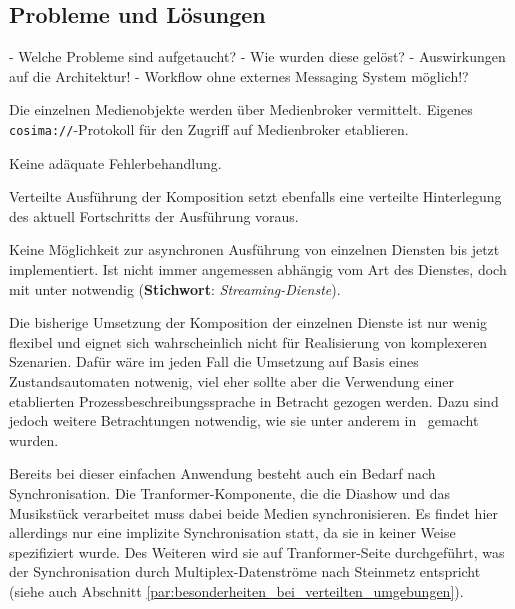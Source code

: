   
\subsection{Probleme und Lösungen} %
\label{sub:probleme_und_loesungen_architektur}

  - Welche Probleme sind aufgetaucht?
  - Wie wurden diese gelöst?
  - Auswirkungen auf die Architektur!
  - Workflow ohne externes Messaging System möglich!?
  
  Die einzelnen Medienobjekte werden über Medienbroker vermittelt. Eigenes \verb!cosima://!-Protokoll für den Zugriff auf Medienbroker etablieren.
    
  Keine adäquate Fehlerbehandlung.
  
  Verteilte Ausführung der Komposition setzt ebenfalls eine verteilte Hinterlegung des aktuell Fortschritts der Ausführung voraus.
  
  Keine Möglichkeit zur asynchronen Ausführung von einzelnen Diensten bis jetzt implementiert. Ist nicht immer angemessen abhängig vom Art des Dienstes, doch mit unter notwendig (\textbf{Stichwort}: \emph{Streaming-Dienste}).
  
  Die bisherige Umsetzung der Komposition der einzelnen Dienste ist nur wenig flexibel und eignet sich wahrscheinlich nicht für Realisierung von komplexeren Szenarien. Dafür wäre im jeden Fall die Umsetzung auf Basis eines Zustandsautomaten notwenig, viel eher sollte aber die Verwendung einer etablierten Prozessbeschreibungssprache in Betracht gezogen werden. Dazu sind jedoch weitere Betrachtungen notwendig, wie sie unter anderem in~\citep{samma08} gemacht wurden.

  Bereits bei dieser einfachen Anwendung besteht auch ein Bedarf nach Synchronisation. Die Tranformer-Komponente, die die Diashow und das Musikstück verarbeitet muss dabei beide Medien synchronisieren. Es findet hier allerdings nur eine implizite Synchronisation statt, da sie in keiner Weise spezifiziert wurde. Des Weiteren wird sie auf Tranformer-Seite durchgeführt, was der Synchronisation durch Multiplex-Datenströme nach Steinmetz entspricht~\citep[S. 609]{multimedia_technologie} (siehe auch Abschnitt \ref{par:besonderheiten_bei_verteilten_umgebungen}).



